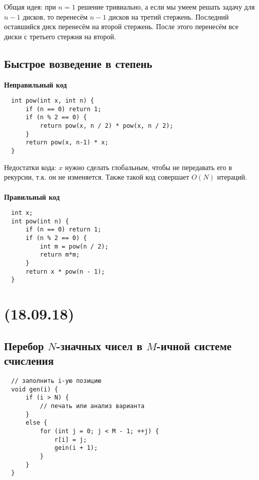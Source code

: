 \documentclass{article}
\begin{document}
Общая идея: при $n = 1$ решение тривиально, а если мы умеем решать задачу для $n-1$ дисков, то перенесём $n-1$
дисков на третий стержень. Последний оставшийся диск перенесём на второй стержень. После этого перенесём все диски
с третьего стержня на второй.

\subsection{Быстрое возведение в степень}

\textbf{Неправильный код}

\noindent
\begin{lstlisting}
  int pow(int x, int n) {
      if (n == 0) return 1;
      if (n % 2 == 0) {
          return pow(x, n / 2) * pow(x, n / 2);
      }
      return pow(x, n-1) * x;
  }
\end{lstlisting}

Недостатки кода: $x$ нужно сделать глобальным, чтобы не передавать его в рекурсии, т.к. он не изменяется.
Также такой код совершает $O(N)$ итераций.

\newpage
\paragraph{}
\textbf{Правильный код}

\noindent
\begin{lstlisting}
  int x;
  int pow(int n) {
      if (n == 0) return 1;
      if (n % 2 == 0) {
          int m = pow(n / 2);
          return m*m;
      }
      return x * pow(n - 1);
  }
\end{lstlisting}

\newpage
\noindent\makebox[\linewidth]{\rule{\paperwidth}{0.4pt}}
\section{(18.09.18)}
\noindent\makebox[\linewidth]{\rule{\paperwidth}{0.4pt}}

\subsection{Перебор $N$-значных чисел в $M$-ичной системе счисления}

\begin{lstlisting}
  // заполнить i-ую позицию
  void gen(i) {
      if (i > N) {
          // печать или анализ варианта
      }
      else {
          for (int j = 0; j < M - 1; ++j) {
              r[i] = j;
              gein(i + 1);
          }
      }
  }
\end{lstlisting}
\end{document}
